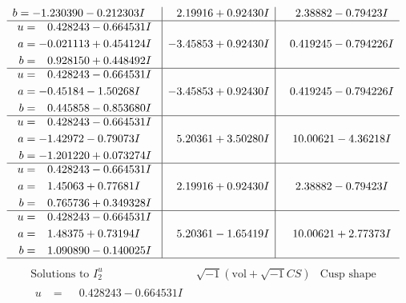 \documentclass[1p]{elsarticle_modified}
\theoremstyle{definition}
\newcommand{\I}{\sqrt{-1}}
\begin{document}
$$\begin{array}{c|c|c}
\begin{aligned}
b &= -1.230390 - 0.212303 I\end{aligned}
 & \phantom{-}2.19916 + 0.92430 I & \phantom{-}2.38882 - 0.79423 I \\ \hline\begin{aligned}
u &= \phantom{-}0.428243 - 0.664531 I \\
a &= -0.021113 + 0.454124 I \\
b &= \phantom{-}0.928150 + 0.448492 I\end{aligned}
 & -3.45853 + 0.92430 I & \phantom{-}0.419245 - 0.794226 I \\ \hline\begin{aligned}
u &= \phantom{-}0.428243 - 0.664531 I \\
a &= -0.45184 - 1.50268 I \\
b &= \phantom{-}0.445858 - 0.853680 I\end{aligned}
 & -3.45853 + 0.92430 I & \phantom{-}0.419245 - 0.794226 I \\ \hline\begin{aligned}
u &= \phantom{-}0.428243 - 0.664531 I \\
a &= -1.42972 - 0.79073 I \\
b &= -1.201220 + 0.073274 I\end{aligned}
 & \phantom{-}5.20361 + 3.50280 I & \phantom{-}10.00621 - 4.36218 I \\ \hline\begin{aligned}
u &= \phantom{-}0.428243 - 0.664531 I \\
a &= \phantom{-}1.45063 + 0.77681 I \\
b &= \phantom{-}0.765736 + 0.349328 I\end{aligned}
 & \phantom{-}2.19916 + 0.92430 I & \phantom{-}2.38882 - 0.79423 I \\ \hline\begin{aligned}
u &= \phantom{-}0.428243 - 0.664531 I \\
a &= \phantom{-}1.48375 + 0.73194 I \\
b &= \phantom{-}1.090890 - 0.140025 I\end{aligned}
 & \phantom{-}5.20361 - 1.65419 I & \phantom{-}10.00621 + 2.77373 I\\
 \hline 
 \end{array}$$\newpage$$\begin{array}{c|c|c}  
\text{Solutions to }I^u_{2}& \I (\text{vol} + \sqrt{-1}CS) & \text{Cusp shape}\\
 \hline 
\begin{aligned}
u &= \phantom{-}0.428243 - 0.664531 I \\

\end{aligned}
\end{array}$$
\end{document}
